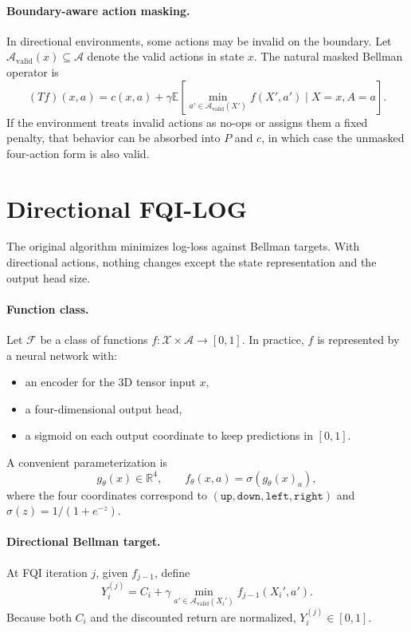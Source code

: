 \documentclass[11pt]{article}
\newcommand{\A}{\mathcal{A}}
\newcommand{\F}{\mathcal{F}}
\newcommand{\X}{\mathcal{X}}
\newcommand{\E}{\mathbb{E}}
\newcommand{\R}{\mathbb{R}}
\newcommand{\up}{\texttt{up}}
\newcommand{\downa}{\texttt{down}}
\newcommand{\lefta}{\texttt{left}}
\newcommand{\righta}{\texttt{right}}
\begin{document}
\paragraph{Boundary-aware action masking.}
In directional environments, some actions may be invalid on the boundary. Let $\A_{\mathrm{valid}}(x) \subseteq \A$ denote the valid actions in state $x$. The natural masked Bellman operator is
\[
(Tf)(x,a) = c(x,a) + \gamma \E\left[\min_{a' \in \A_{\mathrm{valid}}(X')} f(X',a') \mid X=x, A=a\right].
\]
If the environment treats invalid actions as no-ops or assigns them a fixed penalty, that behavior can be absorbed into $P$ and $c$, in which case the unmasked four-action form is also valid.

\section{Directional FQI-LOG}
The original algorithm minimizes log-loss against Bellman targets. With directional actions, nothing changes except the state representation and the output head size.

\paragraph{Function class.}
Let $\F$ be a class of functions $f:\X \times \A \to [0,1]$. In practice, $f$ is represented by a neural network with:
\begin{itemize}[leftmargin=*]
  \item an encoder for the 3D tensor input $x$,
  \item a four-dimensional output head,
  \item a sigmoid on each output coordinate to keep predictions in $[0,1]$.
\end{itemize}

A convenient parameterization is
\[
g_\theta(x) \in \R^4,\qquad
f_\theta(x,a) = \sigma(g_\theta(x)_a),
\]
where the four coordinates correspond to $(\up, \downa, \lefta, \righta)$ and $\sigma(z)=1/(1+e^{-z})$.

\paragraph{Directional Bellman target.}
At FQI iteration $j$, given $f_{j-1}$, define
\[
Y_i^{(j)} = C_i + \gamma \min_{a' \in \A_{\mathrm{valid}}(X_i')} f_{j-1}(X_i', a').
\]
Because both $C_i$ and the discounted return are normalized, $Y_i^{(j)} \in [0,1]$.
\end{document}
